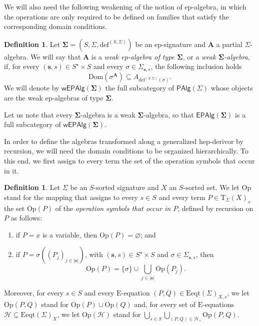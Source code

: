 \documentclass[a4paper, reqno
]{amsart}
\newcommand{\bb}[1]{\ensuremath{\lvert #1 \rvert}}
\newcommand{\sig}[1]{\mathbf{#1}}             %
\newcommand{\Dom}{\mathrm{Dom}}
\theoremstyle{plain}
\theoremstyle{definition}
\newtheorem{definition}[theorem]{Definition}
\begin{document}
We will also need the following weakening of the notion of ep-algebra, in which the operations are only required to be defined on families that satisfy the corresponding domain conditions.

\begin{definition}\label{DWeakEpAlgebra}
Let $\sig{\Sigma}=(S,\Sigma,\mathrm{def}^{(S,\Sigma)})$ be an ep-signature and $\mathbf{A}$ a partial $\Sigma$-algebra.
We will say that $\mathbf{A}$ is a \emph{weak ep-algebra of type $\sig{\Sigma}$}, or a \emph{weak $\sig{\Sigma}$-algebra}, if, for every $(\mathbf{s},s)\in S^{\star}\times S$ and every $\sigma\in\Sigma_{\mathbf{s},s}$, the following inclusion holds
$$
\Dom\left(\sigma^{\mathbf{A}}\right)\subseteq A_{\mathrm{def}^{(S,\Sigma)}(\sigma)}.
$$
We will denote by $\mathsf{wEPAlg}(\sig{\Sigma})$ the full subcategory of $\mathsf{PAlg}(\Sigma)$ whose objects are the weak ep-algebras of type $\sig{\Sigma}$.
\end{definition}

Let us note that every $\sig{\Sigma}$-algebra is a weak $\sig{\Sigma}$-algebra, so that $\mathsf{EPAlg}(\sig{\Sigma})$ is a full subcategory of $\mathsf{wEPAlg}(\sig{\Sigma})$.

In order to define the algebras transformed along a generalized hep-derivor by recursion, we will need the domain conditions to be organized hierarchically.
To this end, we first assign to every term the set of the operation symbols that occur in it.

\begin{definition}\label{DOpSymbols}
Let $\Sigma$ be an $S$-sorted signature and $X$ an $S$-sorted set.
We let $\mathrm{Op}$ stand for the mapping that assigns to every $s\in S$ and every term $P\in\mathrm{T}_{\Sigma}(X)_{s}$ the set $\mathrm{Op}(P)$ of the \emph{operation symbols that occur in $P$}, defined by recursion on $P$ as follows:
\begin{enumerate}
\item if $P=x$ is a variable, then $\mathrm{Op}(P)=\varnothing$; and
\item if $P=\sigma((P_{j})_{j\in\bb{\mathbf{s}}})$, with $(\mathbf{s},s)\in S^{\star}\times S$ and $\sigma\in\Sigma_{\mathbf{s},s}$, then
$$
\mathrm{Op}(P)=\{\sigma\}\cup\textstyle\bigcup_{j\in\bb{\mathbf{s}}}\mathrm{Op}(P_{j}).
$$
\end{enumerate}
Moreover, for every $s\in S$ and every $\mathrm{E}$-equation $(P,Q)\in\mathrm{Eeqt}(\Sigma)_{X,s}$, we let $\mathrm{Op}(P,Q)$ stand for $\mathrm{Op}(P)\cup\mathrm{Op}(Q)$ and, for every set of $\mathrm{E}$-equations $\mathcal{H}\subseteq\mathrm{Eeqt}(\Sigma)_{X}$, we let $\mathrm{Op}(\mathcal{H})$ stand for $\bigcup_{s\in S}\bigcup_{(P,Q)\in\mathcal{H}_{s}}\mathrm{Op}(P,Q)$.
\end{definition}
\end{document}
